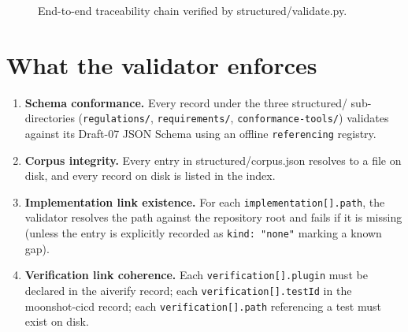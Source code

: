 \documentclass[11pt,a4paper,twoside]{report}
\newcommand{\corpus}{}
\newcommand{\tool}{}
\begin{document}
\begin{figure}[h]
\centering
{}
\caption{End-to-end traceability chain verified by \corpus{structured/validate.py}.}
\label{fig:traceability}
\end{figure}

\section{What the validator enforces}

\begin{enumerate}
\item \textbf{Schema conformance.} Every record under the three
\corpus{structured/} sub-directories
(\texttt{regulations/}, \texttt{requirements/},
\texttt{conformance-tools/}) validates against its Draft-07 JSON
Schema using an offline \texttt{referencing} registry.
\item \textbf{Corpus integrity.} Every entry in
\corpus{structured/corpus.json} resolves to a file on disk, and
every record on disk is listed in the index.
\item \textbf{Implementation link existence.} For each
\texttt{implementation[].path}, the validator resolves the path
against the repository root and fails if it is missing (unless the
entry is explicitly recorded as \texttt{kind: "none"} marking a
known gap).
\item \textbf{Verification link coherence.} Each
\texttt{verification[].plugin} must be declared in the
\tool{aiverify} record; each \texttt{verification[].testId} in the
\tool{moonshot-cicd} record; each \texttt{verification[].path}
referencing a test must exist on disk.
\end{enumerate}
\end{document}
